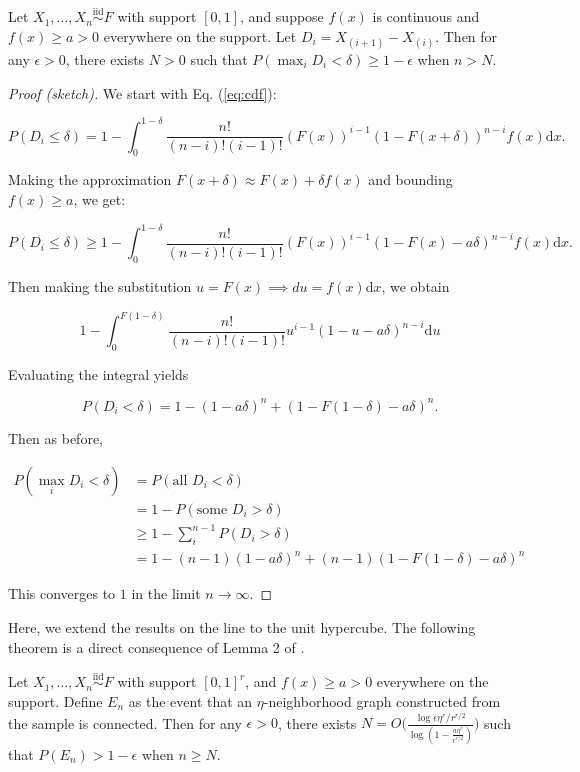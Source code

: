 \documentclass[12pt]{article}
\begin{document}
\begin{lemma}
Let $X_1, ..., X_n \stackrel{\mathrm{iid}}{\sim}F$ with support $[0, 1]$, and suppose $f(x)$ is continuous and $f(x) \geq a > 0$ everywhere on the support. 
Let $D_i = X_{(i+1)} - X_{(i)}$. 
Then for any $\epsilon > 0$, there exists $N > 0$ such that $P(\max_i D_i < \delta) \geq 1 - \epsilon$ when $n > N$.
\end{lemma}

\begin{proof}[Proof (sketch)]
We start with Eq. (\ref{eq:cdf}):

$$P(D_i \leq \delta) = 1 - \int_0^{1-\delta} \frac{n!}{(n-i)! (i-1)!} (F(x))^{i-1} (1 - F(x + \delta))^{n-i} f(x) \mathrm{d}x.$$

Making the approximation $F(x+\delta) \approx F(x) + \delta f(x)$ 
and bounding $f(x) \geq a$, we get:

$$P(D_i \leq \delta) \geq 1 - \int_0^{1-\delta} \frac{n!}{(n-i)! (i-1)!} (F(x))^{i-1} (1 - F(x) - a \delta)^{n-i} f(x) \mathrm{d}x.$$

Then making the substitution $u = F(x) \implies du = f(x) \mathrm{d}x$, we obtain 

$$1 - \int_0^{F(1-\delta)} \frac{n!}{(n-i)! (i-1)!} u^{i-1} (1 - u - a \delta)^{n-i} \mathrm{d}u$$

Evaluating the integral yields

$$P(D_i < \delta) = 1 - (1 - a \delta)^n + (1 - F(1-\delta) - a \delta)^n.$$

Then as before,

$$
\begin{aligned}
P(\max_i D_i < \delta) & = P(\text{all } D_i < \delta) \\
& = 1 - P(\text{some } D_i > \delta) \\
& \geq 1 - \sum_i^{n-1} P(D_i > \delta) \\
& = 1 - (n - 1) (1 - a \delta)^n + (n - 1) (1 - F(1 - \delta) - a \delta)^n
\end{aligned}
$$

This converges to $1$ in the limit $n \to \infty$.
\end{proof}

Here, we extend the results on the line to the unit hypercube. The
following theorem is a direct consequence of Lemma 2 of
\citet{trosset2020rehabilitating}.

\begin{lemma}
\label{thm:multidim}
Let $X_1, ..., X_n \stackrel{\mathrm{iid}}{\sim}F$ with support $[0, 1]^r$, and $f(x) \geq a > 0$ everywhere on the support. 
Define $E_n$ as the event that an $\eta$-neighborhood graph constructed from the sample is connected. 
Then for any $\epsilon > 0$, there exists $N = O \bigg( \frac{\log \epsilon \eta^r / r^{r/2}}{\log (1 - \frac{a \eta^r}{r^{r / 2}})} \bigg)$ such that $P(E_n) > 1 - \epsilon$ when $n \geq N$.
\end{lemma}
\end{document}
